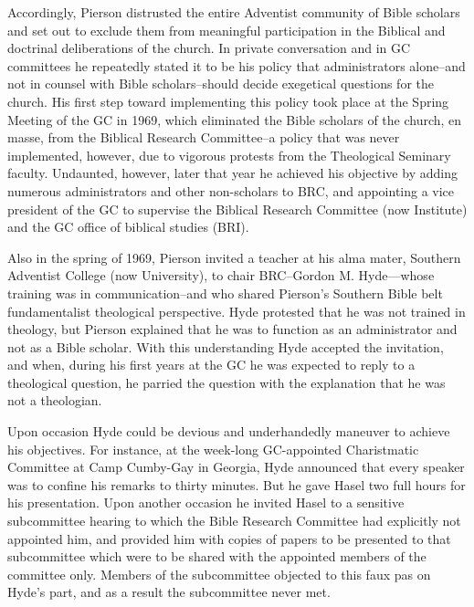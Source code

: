 Accordingly, Pierson distrusted the entire Adventist community of Bible
scholars and set out to exclude them from meaningful participation in the 
Biblical and doctrinal deliberations of the church. In private conversation
and in GC committees he repeatedly stated it to be his policy that
administrators alone--and not in counsel with Bible scholars--should
decide exegetical questions for the church. His first step toward
implementing this policy took place at the Spring Meeting of the GC in 1969,
which eliminated the Bible scholars of the church, en masse, from the
Biblical Research Committee--a policy that was never implemented, however,
due to vigorous protests from the Theological Seminary faculty. Undaunted,
however, later that year he achieved his objective by adding numerous
administrators and other non-scholars to BRC, and appointing a vice
president of the GC to supervise the Biblical Research Committee (now
Institute) and the GC office of biblical studies (BRI).

Also in the spring of 1969, Pierson invited a teacher at his alma mater,
Southern Adventist College (now University), to chair BRC--Gordon M.
Hyde---whose training was in communication--and who shared Pierson's
Southern Bible belt fundamentalist theological perspective. Hyde protested
that he was not trained in theology, but Pierson explained that he was to
function as an administrator and not as a Bible scholar. With this
understanding Hyde accepted the invitation, and when, during his first years
at the GC he was expected to reply to a theological question, he parried the
question with the explanation that he was not a theologian.

Upon occasion Hyde could be devious and underhandedly maneuver to achieve
his objectives. For instance, at the week-long GC-appointed Charistmatic
Committee at Camp Cumby-Gay in Georgia, Hyde announced that every speaker
was to confine his remarks to thirty minutes. But he gave Hasel two full
hours for his presentation. Upon another occasion he invited Hasel to a
sensitive subcommittee hearing to which the Bible Research Committee had
explicitly not appointed him, and provided him with copies of papers to be
presented to that subcommittee which were to be shared with the appointed
members of the committee only. Members of the subcommittee objected to this
faux pas on Hyde's part, and as a result the subcommittee never met.\cite{145}

